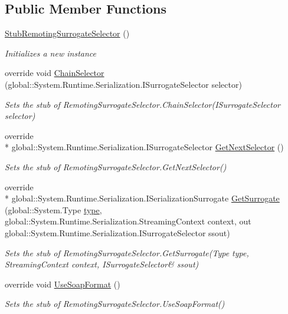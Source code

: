 \subsection*{Public Member Functions}
\begin{DoxyCompactItemize}
\item 
\hyperlink{class_system_1_1_runtime_1_1_remoting_1_1_messaging_1_1_fakes_1_1_stub_remoting_surrogate_selector_a880fae2ada62570cb22387d3a93d498a}{Stub\-Remoting\-Surrogate\-Selector} ()
\begin{DoxyCompactList}\small\item\em Initializes a new instance\end{DoxyCompactList}\item 
override void \hyperlink{class_system_1_1_runtime_1_1_remoting_1_1_messaging_1_1_fakes_1_1_stub_remoting_surrogate_selector_a03f4421b231b10f5062dbe9d1e3980f7}{Chain\-Selector} (global\-::\-System.\-Runtime.\-Serialization.\-I\-Surrogate\-Selector selector)
\begin{DoxyCompactList}\small\item\em Sets the stub of Remoting\-Surrogate\-Selector.\-Chain\-Selector(\-I\-Surrogate\-Selector selector)\end{DoxyCompactList}\item 
override \\*
global\-::\-System.\-Runtime.\-Serialization.\-I\-Surrogate\-Selector \hyperlink{class_system_1_1_runtime_1_1_remoting_1_1_messaging_1_1_fakes_1_1_stub_remoting_surrogate_selector_a8492ceb582fbfbda0526e55449ebe125}{Get\-Next\-Selector} ()
\begin{DoxyCompactList}\small\item\em Sets the stub of Remoting\-Surrogate\-Selector.\-Get\-Next\-Selector()\end{DoxyCompactList}\item 
override \\*
global\-::\-System.\-Runtime.\-Serialization.\-I\-Serialization\-Surrogate \hyperlink{class_system_1_1_runtime_1_1_remoting_1_1_messaging_1_1_fakes_1_1_stub_remoting_surrogate_selector_ac5c3bae627e14d3a637b41b27ae7021a}{Get\-Surrogate} (global\-::\-System.\-Type \hyperlink{jquery-1_810_82-vsdoc_8js_a3940565e83a9bfd10d95ffd27536da91}{type}, global\-::\-System.\-Runtime.\-Serialization.\-Streaming\-Context context, out global\-::\-System.\-Runtime.\-Serialization.\-I\-Surrogate\-Selector ssout)
\begin{DoxyCompactList}\small\item\em Sets the stub of Remoting\-Surrogate\-Selector.\-Get\-Surrogate(Type type, Streaming\-Context context, I\-Surrogate\-Selector\& ssout)\end{DoxyCompactList}\item 
override void \hyperlink{class_system_1_1_runtime_1_1_remoting_1_1_messaging_1_1_fakes_1_1_stub_remoting_surrogate_selector_ac01ea0d43a60741d3542e2b059da5068}{Use\-Soap\-Format} ()
\begin{DoxyCompactList}\small\item\em Sets the stub of Remoting\-Surrogate\-Selector.\-Use\-Soap\-Format()\end{DoxyCompactList}\end{DoxyCompactItemize}
